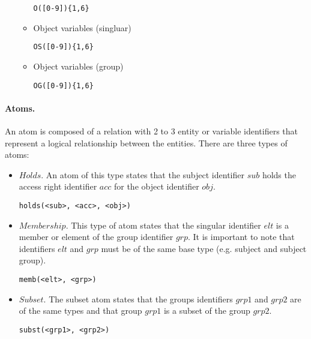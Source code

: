 \documentclass[10pt, twocolumn]{article}
\begin{document}
\begin{itemize}
\begin{itemize}
                  \begin{verbatim}O([0-9]){1,6}\end{verbatim}
                \item
                  Object variables (singluar)

                  \begin{verbatim}OS([0-9]){1,6}\end{verbatim}
                \item
                  Object variables (group)

                  \begin{verbatim}OG([0-9]){1,6}\end{verbatim}
              \end{itemize}
          \end{itemize}

        \paragraph{Atoms.}
          An atom is composed of a relation with 2 to 3 entity or variable
          identifiers that represent a logical relationship between the
          entities. There are three types of atoms:

          \begin{itemize}
            \item
              $Holds$. An atom of this type states that the subject identifier
              $sub$ holds the access right identifier $acc$ for the object
              identifier $obj$.
         
              \begin{verbatim}holds(<sub>, <acc>, <obj>)\end{verbatim}
            \item
              $Membership$. This type of atom states that the singular
              identifier $elt$ is a member or element of the group identifier
              $grp$. It is important to note that identifiers $elt$ and $grp$
              must be of the same base type (e.g. subject and subject group).
         
              \begin{verbatim}memb(<elt>, <grp>)\end{verbatim}
            \item
              $Subset$. The subset atom states that the groups identifiers
              $grp1$ and $grp2$ are of the same types and that group $grp1$
              is a subset of the group $grp2$.

              \begin{verbatim}subst(<grp1>, <grp2>)\end{verbatim}
          \end{itemize}
\end{document}
